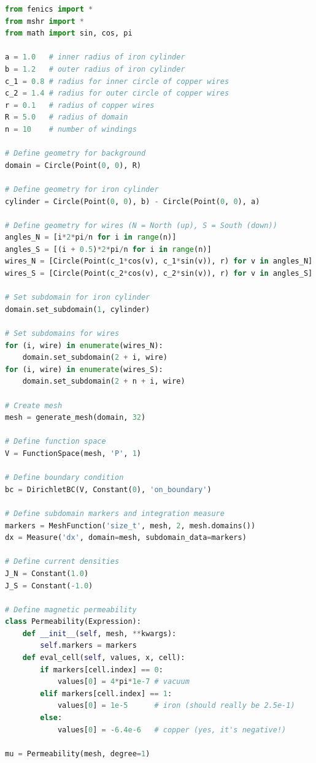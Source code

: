 \documentclass[graybox,envcountchap,sectrefs,final]{svmonodo}
\begin{document}
\begin{lstlisting}[language=Python,style=graycolor]
from fenics import *
from mshr import *
from math import sin, cos, pi

a = 1.0   # inner radius of iron cylinder
b = 1.2   # outer radius of iron cylinder
c_1 = 0.8 # radius for inner circle of copper wires
c_2 = 1.4 # radius for outer circle of copper wires
r = 0.1   # radius of copper wires
R = 5.0   # radius of domain
n = 10    # number of windings

# Define geometry for background
domain = Circle(Point(0, 0), R)

# Define geometry for iron cylinder
cylinder = Circle(Point(0, 0), b) - Circle(Point(0, 0), a)

# Define geometry for wires (N = North (up), S = South (down))
angles_N = [i*2*pi/n for i in range(n)]
angles_S = [(i + 0.5)*2*pi/n for i in range(n)]
wires_N = [Circle(Point(c_1*cos(v), c_1*sin(v)), r) for v in angles_N]
wires_S = [Circle(Point(c_2*cos(v), c_2*sin(v)), r) for v in angles_S]

# Set subdomain for iron cylinder
domain.set_subdomain(1, cylinder)

# Set subdomains for wires
for (i, wire) in enumerate(wires_N):
    domain.set_subdomain(2 + i, wire)
for (i, wire) in enumerate(wires_S):
    domain.set_subdomain(2 + n + i, wire)

# Create mesh
mesh = generate_mesh(domain, 32)

# Define function space
V = FunctionSpace(mesh, 'P', 1)

# Define boundary condition
bc = DirichletBC(V, Constant(0), 'on_boundary')

# Define subdomain markers and integration measure
markers = MeshFunction('size_t', mesh, 2, mesh.domains())
dx = Measure('dx', domain=mesh, subdomain_data=markers)

# Define current densities
J_N = Constant(1.0)
J_S = Constant(-1.0)

# Define magnetic permeability
class Permeability(Expression):
    def __init__(self, mesh, **kwargs):
        self.markers = markers
    def eval_cell(self, values, x, cell):
        if markers[cell.index] == 0:
            values[0] = 4*pi*1e-7 # vacuum
        elif markers[cell.index] == 1:
            values[0] = 1e-5      # iron (should really be 2.5e-1)
        else:
            values[0] = -6.4e-6   # copper (yes, it's negative!)

mu = Permeability(mesh, degree=1)


\end{lstlisting}
\end{document}
